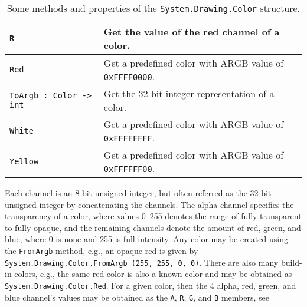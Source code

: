 \begin{table}
\begin{center}
\begin{tabularx}{\linewidth}{|l|X|}
      \hline
      \lstinline{R}
      &Get the value of the red channel of a color.\\
      \hline
      \lstinline{Red}
      &Get a predefined color with ARGB value of \lstinline{0xFFFF0000}.\\
      \hline
      \lstinline{ToArgb : Color -> int}
      &Get the 32-bit integer representation of a color.\\
      \hline
      \lstinline{White}
      &Get a predefined color with ARGB value of \lstinline{0xFFFFFFFF}.\\
      \hline
      \lstinline{Yellow}
      &Get a predefined color with ARGB value of \lstinline{0xFFFFFF00}.\\
      \hline
    \end{tabularx}
  \end{center}
  \caption{Some methods and properties of the \lstinline{System.Drawing.Color}  structure.}
  \label{tab:color}
\end{table}
Each channel is an 8-bit unsigned integer, but often referred as the 32 bit unsigned integer by concatenating the channels. The alpha channel specifies the transparency of a color, where values 0--255 denotes the range of fully transparent to fully opaque, and the remaining channels denote the amount of red, green, and blue, where 0 is none and 255 is full intensity. Any color may be created using the \lstinline!FromArgb! method, e.g., an opaque red is given by \lstinline!System.Drawing.Color.FromArgb (255, 255, 0, 0)!. There are also many build-in colors, e.g., the same red color is also a known color and may be obtained as \lstinline!System.Drawing.Color.Red!. For a given color, then the 4 alpha, red, green, and blue channel's values may be obtained as the \lstinline!A!, \lstinline!R!, \lstinline!G!, and \lstinline!B! members, see 
%
%

